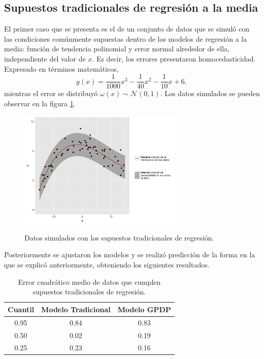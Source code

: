 \subsection{Supuestos tradicionales de regresi\'on a la media}

El primer caso que se presenta es el de un conjunto de datos que se simul\'o con las condiciones com\'unmente supuestas dentro de los modelos de regresi\'on a la media: funci\'on de tendencia polinomial y error normal alrededor de ella, independiente del valor de $x$. Es decir, los errores presentaron homocedasticidad. Expresado en t\'erminos matem\'aticos,
\begin{equation*}
    g(x) = \frac{1}{1000}x^3 - \frac{1}{40}x^2 - \frac{1}{10}x + 6,
\end{equation*}
mientras el error se distribuy\'o $\omega(x) \sim \mathcal{N}(0,1)$. Los datos simulados se pueden observar en la figura \ref{sample_classic}.

\begin{figure}[H]
	\centering
	\caption{Datos simulados con los supuestos tradicionales de regresi\'on.}
	\includegraphics[width=0.7\textwidth]{Figures/Simulation/classic/sample.png}
	\label{sample_classic}
\end{figure}

Posteriormente se ajustaron los modelos y se realiz\'o predicci\'on de la forma en la que se explic\'o anteriormente, obteniendo los siguientes resultados.

\begin{table}[H]
\centering
\caption{Error cuadrático medio de datos que cumplen supuestos tradicionales de regresi\'on.} 
\begin{tabular}{ccc}
  \hline
Cuantil & Modelo Tradicional & Modelo GPDP \\ 
  \hline
0.95 & 0.84 & 0.83 \\ 
  0.50 & 0.02 & 0.19 \\ 
  0.25 & 0.23 & 0.16 \\ 
   \hline
\end{tabular}
\label{mse_classic}
\end{table}

